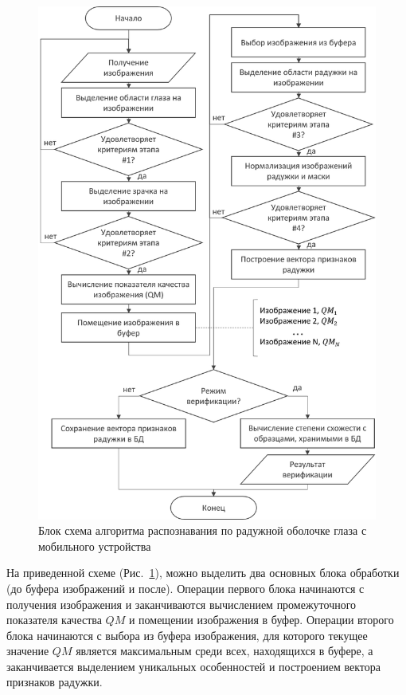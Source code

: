 \begin{figure}[!h]
	\centering
	\includegraphics[width=0.85\columnwidth]{pictures/algorithm_structure.png}
	\caption{Блок схема алгоритма распознавания по радужной оболочке глаза с мобильного устройства}
	\label{fig:algorithm_structure}
\end{figure}

На приведенной схеме (Рис.~\ref{fig:algorithm_structure}), можно выделить два основных блока обработки (до буфера изображений и после). Операции первого блока начинаются с получения изображения и заканчиваются вычислением промежуточного показателя качества $QM$ и помещении изображения в буфер. Операции второго блока начинаются с выбора из буфера изображения, для которого текущее значение $QM$ является максимальным среди всех, находящихся в буфере, а заканчивается выделением уникальных особенностей и построением вектора признаков радужки.

